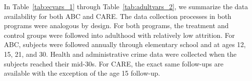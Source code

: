 In Table~\ref{tab:ecvars_1} through Table~\ref{tab:adultvars_2}, we summarize the data availability for both ABC and CARE. The data collection processes in both programs were analogous by design. For both programs, the treatment and control groups were followed into adulthood with relatively low attrition. For ABC, subjects were followed annually through elementary school and at ages 12, 15, 21, and 30. Health and administrative crime data were collected when the subjects reached their mid-30s. For CARE, the exact same follow-ups are available with the exception of the age 15 follow-up.\\

